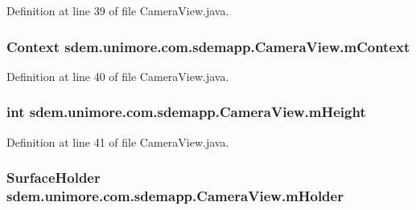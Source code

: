 Definition at line 39 of file Camera\+View.\+java.

\hypertarget{classsdem_1_1unimore_1_1com_1_1sdemapp_1_1_camera_view_a277f9e02a27eaebc0d06166aa6fdcd3b}{
\subsubsection[{m\+Context}]{\setlength{\rightskip}{0pt plus 5cm}Context sdem.\+unimore.\+com.\+sdemapp.\+Camera\+View.\+m\+Context\hspace{0.3cm}{\ttfamily [private]}}}\label{classsdem_1_1unimore_1_1com_1_1sdemapp_1_1_camera_view_a277f9e02a27eaebc0d06166aa6fdcd3b}


Definition at line 40 of file Camera\+View.\+java.

\hypertarget{classsdem_1_1unimore_1_1com_1_1sdemapp_1_1_camera_view_ab8c6faf182aab5fa2a4fb732046d69d5}{
\subsubsection[{m\+Height}]{\setlength{\rightskip}{0pt plus 5cm}int sdem.\+unimore.\+com.\+sdemapp.\+Camera\+View.\+m\+Height\hspace{0.3cm}{\ttfamily [private]}}}\label{classsdem_1_1unimore_1_1com_1_1sdemapp_1_1_camera_view_ab8c6faf182aab5fa2a4fb732046d69d5}


Definition at line 41 of file Camera\+View.\+java.

\hypertarget{classsdem_1_1unimore_1_1com_1_1sdemapp_1_1_camera_view_ae76cc9a21aaf87eeec89eeab7098197b}{
\subsubsection[{m\+Holder}]{\setlength{\rightskip}{0pt plus 5cm}Surface\+Holder sdem.\+unimore.\+com.\+sdemapp.\+Camera\+View.\+m\+Holder\hspace{0.3cm}{\ttfamily [private]}}}\label{classsdem_1_1unimore_1_1com_1_1sdemapp_1_1_camera_view_ae76cc9a21aaf87eeec89eeab7098197b}


